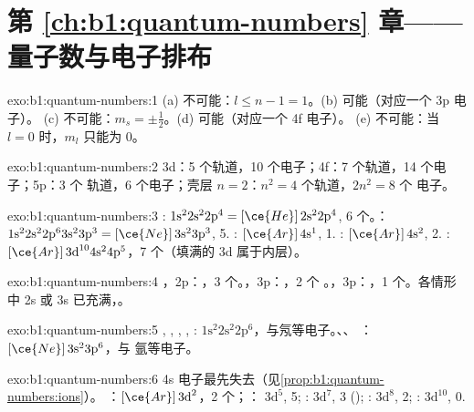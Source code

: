 \section*{第 \ref{ch:b1:quantum-numbers} 章——量子数与电子排布}

\begin{solution}{exo:b1:quantum-numbers:1}
(a) 不可能：$l \le n - 1 = 1$。(b) 可能（对应一个 3p 电子）。
(c) 不可能：$m_s = \pm\tfrac12$。(d) 可能（对应一个 4f 电子）。
(e) 不可能：当 $l = 0$ 时，$m_l$ 只能为 0。
\end{solution}

\begin{solution}{exo:b1:quantum-numbers:2}
3d：5 个轨道，10 个电子；4f：7 个轨道，14 个电子；5p：3 个
轨道，6 个电子；壳层 $n = 2$：$n^2 = 4$ 个轨道，$2n^2 = 8$ 个
电子。
\end{solution}

\begin{solution}{exo:b1:quantum-numbers:3}
: $1\text{s}^2 2\text{s}^2 2\text{p}^4 = [\ce{He}]\,2\text{s}^2 2\text{p}^4$,
6 个。：$1\text{s}^2 2\text{s}^2 2\text{p}^6 3\text{s}^2
3\text{p}^3 = [\ce{Ne}]\,3\text{s}^2 3\text{p}^3$, 5. : $[\ce{Ar}]\,4\text{s}^1$,
1. : $[\ce{Ar}]\,4\text{s}^2$, 2. : $[\ce{Ar}]\,3\text{d}^{10}
4\text{s}^2 4\text{p}^5$，7 个（填满的 3d 属于内层）。
\end{solution}

\begin{solution}{exo:b1:quantum-numbers:4}
，2p：，3 个。，3p：，2 个
。，3p：，1 个。各情形中 2s 或
3s 已充满，。
\end{solution}

\begin{solution}{exo:b1:quantum-numbers:5}
, , , , : $1\text{s}^2
2\text{s}^2 2\text{p}^6$，与氖等电子。、、
：$[\ce{Ne}]\,3\text{s}^2 3\text{p}^6$，与
氩等电子。
\end{solution}

\begin{solution}{exo:b1:quantum-numbers:6}
4s 电子最先失去（见\cref{prop:b1:quantum-numbers:ions}）。
：$[\ce{Ar}]\,3\text{d}^2$，2 个；：
$3\text{d}^5$, 5; : $3\text{d}^7$, 3 ();
: $3\text{d}^8$, 2; : $3\text{d}^{10}$, 0.
\end{solution}

